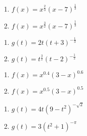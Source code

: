 \begin{multicols}{2}
\begin{enumerate}
\setcounter{enumi}{\value{HW}}

\item $f(x) = x^{\frac{2}{3}}(x - 7)^{\frac{1}{3}}$  \label{powerfcngraphexfirst}
\item $f(x) = x^{\frac{3}{2}}(x - 7)^{\frac{1}{3}}$ 


\setcounter{HW}{\value{enumi}}
\end{enumerate}
\end{multicols}

\begin{multicols}{2}
\begin{enumerate}
\setcounter{enumi}{\value{HW}}

\item $g(t) = 2t(t+3)^{-\frac{1}{3}}$ 
\item $g(t) = t^{\frac{3}{2}}(t-2)^{-\frac{1}{2}}$ 


\setcounter{HW}{\value{enumi}}
\end{enumerate}
\end{multicols}

\begin{multicols}{2}
\begin{enumerate}
\setcounter{enumi}{\value{HW}}

\item $f(x) = x^{0.4} (3-x)^{0.6}$ 
\item $f(x) = x^{0.5} (3-x)^{0.5}$ 


\setcounter{HW}{\value{enumi}}
\end{enumerate}
\end{multicols}

\begin{multicols}{2}
\begin{enumerate}
\setcounter{enumi}{\value{HW}}

\item $g(t) = 4t (9-t^2)^{-\sqrt{2}}$ 
\item $g(t) = 3(t^2+1)^{-\pi}$  \label{powerfcngraphexlast}


\setcounter{HW}{\value{enumi}}
\end{enumerate}
\end{multicols}

